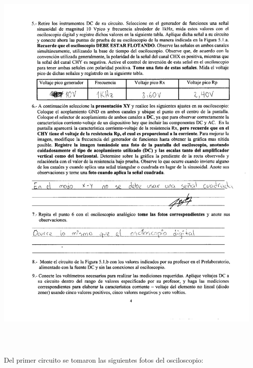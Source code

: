 \documentclass[12pt]{article}
\begin{document}
	\begin{center}
		\includegraphics[width=16cm,height=20cm]{Img/anexo_0002}
	\end{center}

	\newpage
	
	\noindent Del primer circuito se tomaron las siguientes fotos del osciloscopio: 
	
\end{document}
